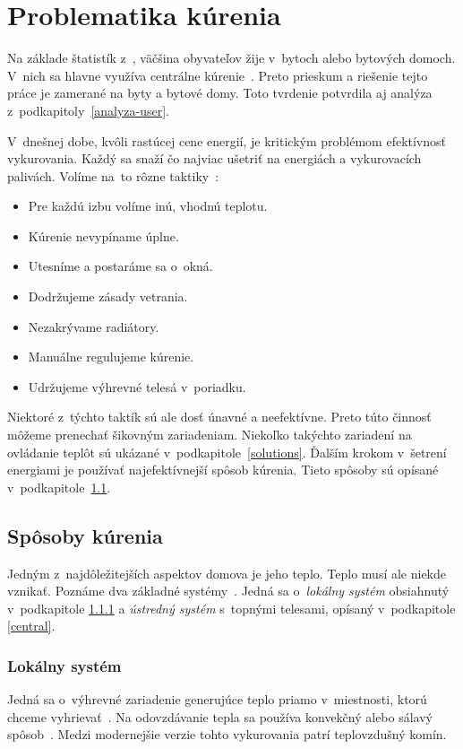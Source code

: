 \chapter{Problematika kúrenia}\label{kur}
Na základe štatistík z~\cite{scitanie_2021}, väčšina obyvateľov žije v~bytoch alebo bytových domoch. 
V~nich sa hlavne využíva centrálne kúrenie~\cite{kurenie_byt}. 
Preto prieskum a riešenie tejto práce je zamerané na byty a bytové domy.
Toto tvrdenie potvrdila aj analýza z~podkapitoly~\ref{analyza-user}.

V~dnešnej dobe, kvôli rastúcej cene energií, je kritickým problémom efektívnosť vykurovania. 
Každý sa snaží čo najviac ušetriť na energiách a vykurovacích palivách. 
Volíme na~to rôzne taktiky~\cite{triky_kurenia_2020}:
\begin{itemize}
    \item Pre každú izbu volíme inú, vhodnú teplotu.
    \item Kúrenie nevypíname úplne.
    \item Utesníme a postaráme sa o~okná.
    \item Dodržujeme zásady vetrania.
    \item Nezakrývame radiátory.
    \item Manuálne regulujeme kúrenie.
    \item Udržujeme výhrevné telesá v~poriadku.
\end{itemize}
Niektoré z~týchto taktík sú ale dosť únavné a neefektívne.
Preto túto činnosť môžeme prenechať šikovným zariadeniam. 
Niekoľko takýchto zariadení na ovládanie teplôt sú ukázané v~podkapitole~\ref{solutions}. 
Ďalším krokom v~šetrení energiami je používať najefektívnejší spôsob kúrenia. 
Tieto spôsoby sú opísané v~podkapitole~\ref{heating}.


\section{Spôsoby kúrenia}\label{heating}
Jedným z~najdôležitejších aspektov domova je jeho teplo. 
Teplo musí ale niekde vznikať. 
Poznáme dva základné systémy~\cite{kubba2012handbook}. 
Jedná sa o~\emph{lokálny systém} obsiahnutý v~podkapitole \ref{local} a \emph{ústredný systém} s~topnými telesami, opísaný v~podkapitole \ref{central}.

\subsection{Lokálny systém}\label{local}
Jedná sa o~výhrevné zariadenie generujúce teplo priamo v~miestnosti, ktorú chceme vyhrievať~\cite{purkynve1891topeni}. 
Na odovzdávanie tepla sa používa konvekčný alebo sálavý spôsob~\cite{lokal}.
Medzi modernejšie verzie tohto vykurovania patrí teplovzdušný komín.


